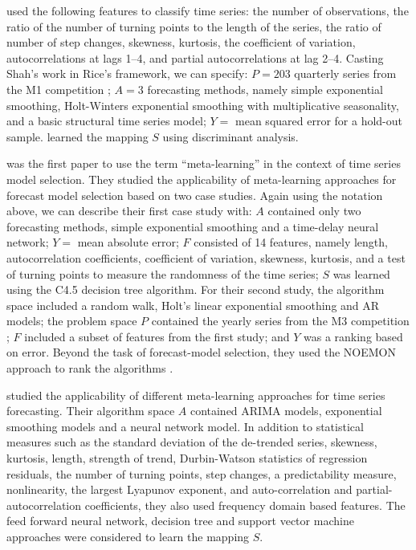 \documentclass[11pt,a4paper,]{article}
\begin{document}
\textcite{shah1997model} used the following features to classify time series: the number of observations, the ratio of the number of turning points to the length of the series, the ratio of number of step changes, skewness, kurtosis, the coefficient of variation, autocorrelations at lags 1--4, and partial autocorrelations at lag 2--4. Casting Shah's work in Rice's framework, we can specify: \(P=203\) quarterly series from the M1 competition \autocite{makridakis1982accuracy}; \(A=3\) forecasting methods, namely simple exponential smoothing, Holt-Winters exponential smoothing with multiplicative seasonality, and a basic structural time series model; \(Y=\) mean squared error for a hold-out sample. \textcite{shah1997model} learned the mapping \(S\) using discriminant analysis.

\textcite{prudencio2004meta} was the first paper to use the term ``meta-learning'' in the context of time series model selection. They studied the applicability of meta-learning approaches for forecast model selection based on two case studies. Again using the notation above, we can describe their first case study with: \(A\) contained only two forecasting methods, simple exponential smoothing and a time-delay neural network; \(Y=\) mean absolute error; \(F\) consisted of 14 features, namely length, autocorrelation coefficients, coefficient of variation, skewness, kurtosis, and a test of turning points to measure the randomness of the time series; \(S\) was learned using the C4.5 decision tree algorithm. For their second study, the algorithm space included a random walk, Holt's linear exponential smoothing and AR models; the problem space \(P\) contained the yearly series from the M3 competition \autocite{makridakis2000m3}; \(F\) included a subset of features from the first study; and \(Y\) was a ranking based on error. Beyond the task of forecast-model selection, they used the NOEMON approach to rank the algorithms \autocite{kalousis1999noemon}.

\textcite{lemke2010meta} studied the applicability of different meta-learning approaches for time series forecasting. Their algorithm space \(A\) contained ARIMA models, exponential smoothing models and a neural network model. In addition to statistical measures such as the standard deviation of the de-trended series, skewness, kurtosis, length, strength of trend, Durbin-Watson statistics of regression residuals, the number of turning points, step changes, a predictability measure, nonlinearity, the largest Lyapunov exponent, and auto-correlation and partial-autocorrelation coefficients, they also used frequency domain based features. The feed forward neural network, decision tree and support vector machine approaches were considered to learn the mapping \(S\).
\end{document}
